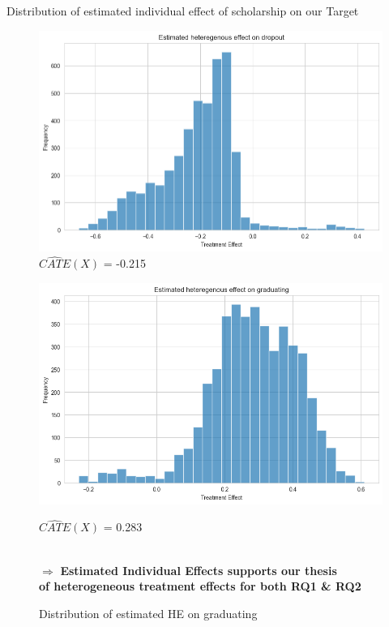 \documentclass[aspectratio=169]{beamer}
\begin{document}
\begin{frame}{Distribution of estimated individual effect of scholarship on our Target}

\begin{figure}[h!]
    \begin{minipage}[b]{0.45\textwidth}
        \caption{Distribution of estimated HE on droupout}
        \includegraphics[width=1\linewidth]{Tex_Pictures/Distribution_of_TE_drop_out.png}
		$\widehat{CATE}(X)$ = -0.215
       
    \end{minipage}
    \hspace{0.05\textwidth}
    \begin{minipage}[b]{0.45\textwidth}
        \caption{Distribution of estimated HE on graduating}
        \includegraphics[width=1\linewidth]{Tex_Pictures/Distribution_TE_graduate.png}

         $\widehat{CATE}(X)$ = 0.283
       
    \end{minipage}
    \centering \\
    $\Rightarrow$ \textbf{Estimated Individual Effects supports our thesis\\of heterogeneous treatment effects for both RQ1 \& RQ2}

 \end{figure}   
\end{frame}
\end{document}

